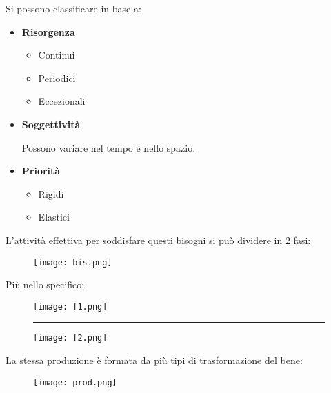 \documentclass{article}
\begin{document}
\noindent Si possono classificare in base a:
\begin{itemize}
    \item \textbf{Risorgenza}
        \begin{itemize}
            \item Continui
            \item Periodici
            \item Eccezionali
        \end{itemize}
    \item \textbf{Soggettività}

        Possono variare nel tempo e nello spazio.
    
    \item \textbf{Priorità}
        \begin{itemize}
            \item Rigidi
            \item Elastici\newline
        \end{itemize}
\end{itemize}

\noindent L'attività effettiva per soddisfare questi bisogni si può dividere in 2 fasi:

\begin{figure}[ht]
    \centering
    \texttt{[image: bis.png]}
\end{figure}

\newpage

\noindent Più nello specifico:

\begin{figure}[H]
    \centering
    \texttt{[image: f1.png]}
    \noindent\rule{\textwidth}{0.5pt}\newline
\end{figure}

\begin{figure}[H]
    \centering
    \texttt{[image: f2.png]}
\end{figure}

\newpage

\noindent La stessa produzione è formata da più tipi di trasformazione del bene:\newline

\begin{figure}[ht]
    \centering
    \texttt{[image: prod.png]}
\end{figure}
\end{document}
